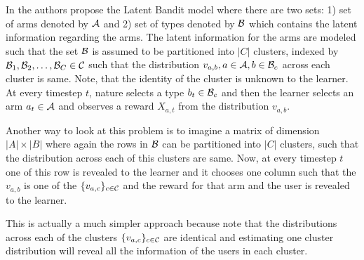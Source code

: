In \citet{maillard2014latent} the authors propose the Latent Bandit model where there are two sets: 1) set of arms denoted by $\mathcal{A}$ and 2) set of types denoted by $\mathcal{B}$ which contains the latent information regarding the arms. The latent information for the arms are modeled such that the set $\mathcal{B}$ is assumed to be partitioned into $|C|$ clusters, indexed by $\mathcal{B}_1, \mathcal{B}_2, \ldots, \mathcal{B}_C \in \mathcal{C}$ such that the distribution $v_{a,b}, a\in\mathcal{A}, b\in\mathcal{B}_c$ across each cluster is same.  Note, that the identity of the cluster is unknown to the learner. At every timestep $t$, nature selects a type $b_t\in\mathcal{B}_c$ and then the learner selects an arm $a_t\in\mathcal{A}$ and observes a reward $X_{a,t}$ from the distribution $v_{a,b}$.
	
	Another way to look at this problem is to imagine a matrix of dimension $|A|\times |B|$ where again the rows in $\mathcal{B}$ can be partitioned into $|C|$ clusters, such that the distribution across each of this clusters are same. Now, at every timestep $t$ one of this row is revealed to the learner and it chooses one column such that the $v_{a,b}$ is one of the $\lbrace v_{a,c}\rbrace_{c\in\mathcal{C}}$ and the reward for that arm and the user is revealed to the learner.
	
	This is actually a much simpler approach because note that the distributions across each of the clusters $\lbrace v_{a,c}\rbrace_{c\in\mathcal{C}}$ are identical and estimating one cluster distribution will reveal all the information of the users in each cluster.